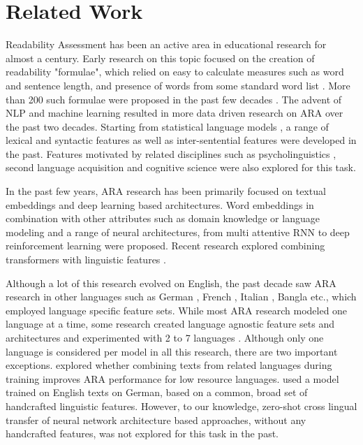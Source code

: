 \documentclass[11pt]{article}
\begin{document}
\section{Related Work}
\label{sec:relw}
Readability Assessment has been an active area in educational research for almost a century. Early research on this topic focused on the creation of readability "formulae", which relied on easy to calculate measures such as word and sentence length, and presence of words from some standard word list \cite{Lively.Pressey-23,Flesch-48,Stenner-96}. More than 200 such formulae were proposed in the past few decades . The advent of NLP and machine learning resulted in more data driven research on ARA over the past two decades. Starting from statistical language models \cite{Si.Callan-01}, a range of lexical and syntactic features \cite{Heilman.Collins-Thompson.ea-07,Petersen.Ostendorf-09,Ambati.Reddy.ea-16} as well as inter-sentential features \cite{Pitler.Nenkova-08,Todirascu.Francois.ea-13,Xia.Kochmar.ea-16} were developed in the past. Features motivated by related disciplines such as  psycholinguistics \cite{Howcroft.Demberg-17}, second language acquisition \cite{Vajjala.Meurers-12} and cognitive science \cite{Feng.Elhadad-09} were also explored for this task. 

In the past few years, ARA research has been primarily focused on textual embeddings and deep learning based architectures. Word embeddings in combination with other attributes such as domain knowledge or language modeling \cite{Cha.Gwon.ea-17,Jiang.Gu.ea-18} and a range of neural architectures, from multi attentive RNN \cite{Azpiazu.Pera-19} to deep reinforcement learning \cite{Mohammadi.Khasteh.ea-19} were proposed. Recent research explored combining transformers with linguistic features \cite{Deutsch.Jasbi.ea-20,Meng.Chen.ea-20,Lee.Jang.ea-21,Imperial-21}. 

Although a lot of this research evolved on English, the past decade saw ARA research in other languages such as German \cite{Hancke.Vajjala.ea-12}, French \cite{Francois.Fairon-12}, Italian \cite{DellOrletta.Montemagni.ea-11}, Bangla \cite{Sinha.Sharma.ea-12} etc., which employed language specific feature sets. While most ARA research modeled one language at a time, some research created language agnostic feature sets and architectures and experimented with 2 to 7 languages \cite{Shen.Williams.ea-13,Azpiazu.Pera-19,Madrazo.Pera-20a,Madrazo.Pera-20b,Martinc.Pollak.ea-21,Weiss.Chen.ea-21}. Although only one language is considered per model in all this research, there are two important exceptions.  explored whether combining texts from related languages during training improves ARA performance for low resource languages.  used a model trained on English texts on German, based on a common, broad set of handcrafted linguistic features. However, to our knowledge, zero-shot cross lingual transfer of neural network architecture based approaches, without any handcrafted features, was not explored for this task in the past. 
\end{document}
